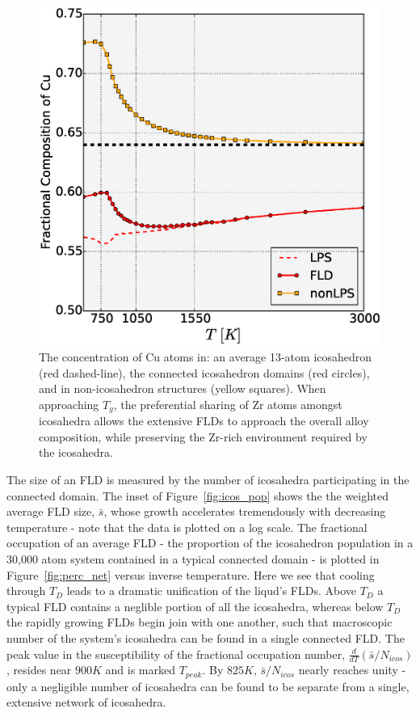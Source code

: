 \documentclass[aps,prl,preprint,showpacs,amsmath,floatfix,superscriptaddress]{revtex4}
\begin{document}
\begin{figure}[t]
\includegraphics[scale=0.38]{Thesis_composition.eps}
\caption{The concentration of Cu atoms in: an average 13-atom icosahedron (red dashed-line),
the connected icosahedron domains (red circles),
and in non-icosahedron structures (yellow squares). When approaching $T_{g}$,
the preferential sharing of Zr atoms amongst icosahedra allows
the extensive FLDs to approach the overall alloy composition, while
preserving the Zr-rich environment required by the icosahedra.} \label{fig:comp}
\end{figure}

The size of an FLD is measured by the number of icosahedra
participating in the connected domain. The inset of
Figure~\ref{fig:icos_pop} shows the the weighted average FLD size,
$\bar s$, whose growth accelerates tremendously with decreasing
temperature - note that the data is plotted on a log scale. The
fractional occupation of an average FLD - the proportion of the
icosahedron population in a 30,000 atom system contained in a
typical connected domain - is plotted in Figure~\ref{fig:perc_net}
versus inverse temperature. Here we see that cooling through
$T_{D}$ leads to a dramatic unification of the liqud's FLDs. Above
$T_{D}$ a typical FLD contains a neglible portion of all the
icosahedra, whereas below $T_{D}$ the rapidly growing FLDs begin
join with one another, such that macroscopic number of the
system's icosahedra can be found in a single connected FLD. The
peak value in the susceptibility of the fractional occupation
number, $\frac{d}{dT}(\bar s/N_{icos})$, resides near $900K$ and
is marked $T_{peak}$. By $825K$, $\bar s/N_{icos}$ nearly reaches
unity - only a negligible number of icosahedra can be found to be
separate from a single, extensive network of icosahedra.
\end{document}
